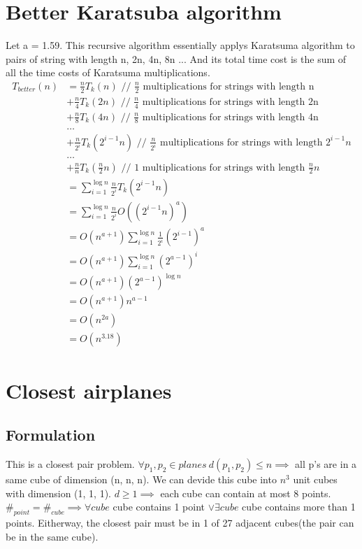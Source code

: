 \documentclass{article}
\begin{document}
\section{Better Karatsuba algorithm}
Let a = 1.59.
This recursive algorithm essentially applys Karatsuma algorithm to pairs
of string with length n, 2n, 4n, 8n ... And its total time cost is the sum
of all the time costs of Karatsuma multiplications.
\begin{align*}
T_{better}(n)&= \frac{n}{2}T_k(n) \text{ // $\frac{n}{2}$ multiplications for
strings with length n} \\
&+ \frac{n}{4}T_k(2n) \text{ // $\frac{n}{4}$ multiplications for strings with
length 2n} \\
&+ \frac{n}{8}T_k(4n) \text{ // $\frac{n}{8}$ multiplications for strings with
length 4n} \\
& \ldots \\
&+ \frac{n}{2^{i}}T_k(2^{i-1}n) \text{ // $\frac{n}{2^{i}}$ multiplications
for strings with length $2^{i-1}n$} \\
& \ldots \\
&+ \frac{n}{n}T_k(\frac{n}{2}n) \text{ // $1$ multiplications for strings with
length $\frac{n}{2}n$} \\
&= \sum_{i = 1}^{\log n} \frac{n}{2^{i}} T_k(2^{i-1}n) \\
&= \sum_{i = 1}^{\log n} \frac{n}{2^{i}} O((2^{i-1}n)^a) \\
&= O(n^{a+1}) \sum_{i = 1}^{\log n} \frac{1}{2^{i}} (2^{i-1})^a \\
&= O(n^{a+1}) \sum_{i = 1}^{\log n} (2^{a-1})^{i} \\
&= O(n^{a+1}) (2^{a-1})^{\log n} \\
&= O(n^{a+1}) n^{a-1} \\
&= O(n^{2a}) \\
&= O(n^{3.18})
\end{align*}

\section{Closest airplanes}
\subsection{Formulation}
This is a closest pair problem. $\forall p_1, p_2 \in planes \ d(p_1, p_2) \leq
n \implies$ all p's are in a same cube of dimension (n, n, n). We can devide
this cube into $n^3$ unit cubes with dimension (1, 1, 1). $d \geq 1 \implies$
each cube can contain at most 8
points. $\#_{point} = \#_{cube} \implies \forall cube$ cube contains 1
point $\lor \exists cube$ cube contains more than 1 points. Eitherway, the
closest pair must be in 1 of 27 adjacent cubes(the pair can be in the same cube).
\end{document}
